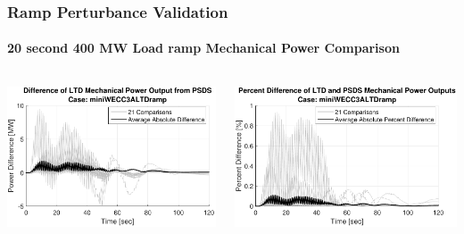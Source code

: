 \documentclass[14pt, unknownkeysallowed]{beamer}
\begin{document}
\begin{frame}
\frametitle{Ramp Perturbance Validation}
\framesubtitle{20 second 400 MW Load ramp Mechanical Power Comparison}
\begin{columns}
\begin{column}{.5\linewidth}
	\includegraphics[width=\linewidth]{miniWECC3ALTDrampPm2}
\end{column}
\begin{column}{.5\linewidth}
	\includegraphics[width=\linewidth]{miniWECC3ALTDrampPm3}
\end{column}
\end{columns}
\end{frame}
\end{document}
